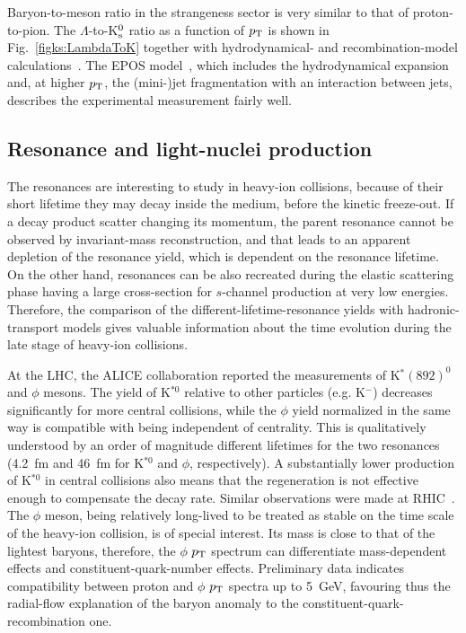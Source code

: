 Baryon-to-meson ratio in the strangeness sector is very similar to that of proton-to-pion. The $\Lambda$-to-K$_{\rm s}^0$ ratio as a function of $p_{\rm T}$ is shown in Fig.~\ref{figks:LambdaToK} together with hydrodynamical- and recombination-model calculations~\cite{Song:2007ux,Song:2008si,Song:2011qa}. The EPOS model~\cite{Werner:2012sv}, which includes the hydrodynamical expansion and, at higher $p_{\rm T}$, the (mini-)jet fragmentation with an interaction between jets, describes the experimental measurement fairly well.
\subsection{Resonance and light-nuclei production}
\label{subsecks:resonace}
The resonances are interesting to study in heavy-ion collisions, because of their short lifetime they may decay inside the medium, before the kinetic freeze-out. If a decay product scatter changing its momentum, the parent resonance  cannot be observed by invariant-mass reconstruction, and that leads to an apparent depletion of the resonance yield, which is dependent on the resonance lifetime. On the other hand, resonances can be also recreated during the elastic scattering phase having a large cross-section for $s$-channel production at very low energies. Therefore, the comparison of the different-lifetime-resonance yields with hadronic-transport models gives valuable information about the time evolution during the late stage of heavy-ion collisions.

At the LHC, the ALICE collaboration reported the measurements of K$^*(892)^0$ and $\phi$ mesons. The yield of K$^{*0}$ relative to other particles (e.g. K$^-$) decreases significantly for more central collisions, while the $\phi$ yield normalized in the same way is compatible with being independent of centrality. This is qualitatively understood by an order of magnitude different lifetimes for the two resonances (4.2~fm and 46~fm for K$^{*0}$ and $\phi$, respectively). A substantially lower production of K$^{*0}$ in central collisions also means that the regeneration is not effective enough to compensate the decay rate. Similar observations were made at RHIC~\cite{Aggarwal:2010mt}. The $\phi$ meson, being relatively long-lived to be treated as stable on the time scale of the heavy-ion collision, is of special interest. Its mass is close to that of the lightest baryons, therefore, the $\phi$ $p_{\rm T}$ spectrum can differentiate mass-dependent effects and constituent-quark-number effects. Preliminary data indicates compatibility between proton and  $\phi$ $p_{\rm T}$ spectra up to 5~GeV, favouring thus the radial-flow explanation of the baryon anomaly to the constituent-quark-recombination one.

